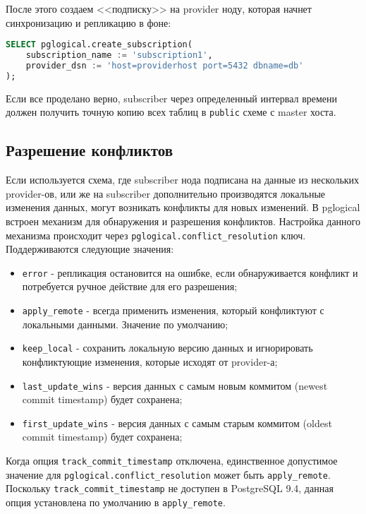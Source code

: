 После этого создаем <<подписку>> на provider ноду, которая начнет синхронизацию и репликацию в фоне:

\begin{lstlisting}[label=lst:pglogical7,language=SQL,caption=Активируем subscriber]
SELECT pglogical.create_subscription(
    subscription_name := 'subscription1',
    provider_dsn := 'host=providerhost port=5432 dbname=db'
);
\end{lstlisting}

Если все проделано верно, subscriber через определенный интервал времени должен получить точную копию всех таблиц в \lstinline!public! схеме с master хоста.


\subsection{Разрешение конфликтов}


Если используется схема, где subscriber нода подписана на данные из нескольких provider-ов, или же на subscriber дополнительно производятся локальные изменения данных, могут возникать конфликты для новых изменений. В pglogical встроен механизм для обнаружения и разрешения конфликтов. Настройка данного механизма происходит через  \lstinline!pglogical.conflict_resolution! ключ. Поддерживаются следующие значения:

\begin{itemize}
  \item \lstinline!error! - репликация остановится на ошибке, если обнаруживается конфликт и потребуется ручное действие для его разрешения;
  \item \lstinline!apply_remote! - всегда применить изменения, который конфликтуют с локальными данными. Значение по умолчанию;
  \item \lstinline!keep_local! - сохранить локальную версию данных и игнорировать конфликтующие изменения, которые исходят от provider-а;
  \item \lstinline!last_update_wins! - версия данных с самым новым коммитом (newest commit timestamp) будет сохранена;
  \item \lstinline!first_update_wins! - версия данных с самым старым коммитом (oldest commit timestamp) будет сохранена;
\end{itemize}

Когда опция \lstinline!track_commit_timestamp! отключена, единственное допустимое значение для \lstinline!pglogical.conflict_resolution! может быть \lstinline!apply_remote!. Поскольку \lstinline!track_commit_timestamp! не доступен в PostgreSQL 9.4, данная опция установлена по умолчанию в \lstinline!apply_remote!.



